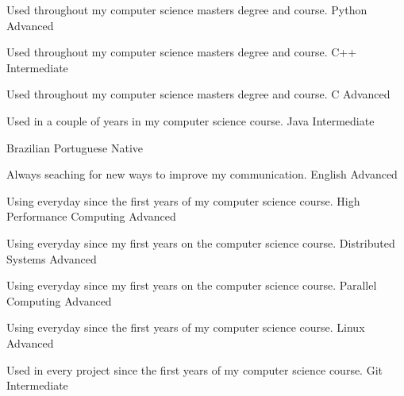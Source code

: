 

\begin{cventries}

    \cventry
    {Used throughout my computer science masters degree and course.}
    {Python} %
    {Advanced} %
    {}
    {}

    \cventry
    {Used throughout my computer science masters degree and course.}
    {C++} %
    {Intermediate} %
    {}
    {}

    \cventry
    {Used throughout my computer science masters degree and course.}
    {C} %
    {Advanced} %
    {}
    {}

    \cventry
    {Used in a couple of years in my computer science course.}
    {Java} %
    {Intermediate} %
    {}
    {}
\end{cventries}

\begin{cventries}

  \cventry
  {}
  {Brazilian Portuguese}
  {Native}
  {}
  {}

  \cventry
  {Always seaching for new ways to improve my communication.}
  {English}
  {Advanced}
  {}
  {}

\end{cventries}

\begin{cventries}

  \cventry
  {Using everyday since the first years of my computer science course.}
  {High Performance Computing}
  {Advanced}
  {}
  {}

  \cventry
  {Using everyday since my first years on the computer science course.}
  {Distributed Systems}
  {Advanced}
  {}
  {}

  \cventry
  {Using everyday since my first years on the computer science course.}
  {Parallel Computing}
  {Advanced}
  {}
  {}

  \cventry
  {Using everyday since the first years of my computer science course.}
  {Linux}
  {Advanced}
  {}
  {}

  \cventry
  {Used in every project since the first years of my computer science course.}
  {Git}
  {Intermediate}
  {}
  {}

\end{cventries}
